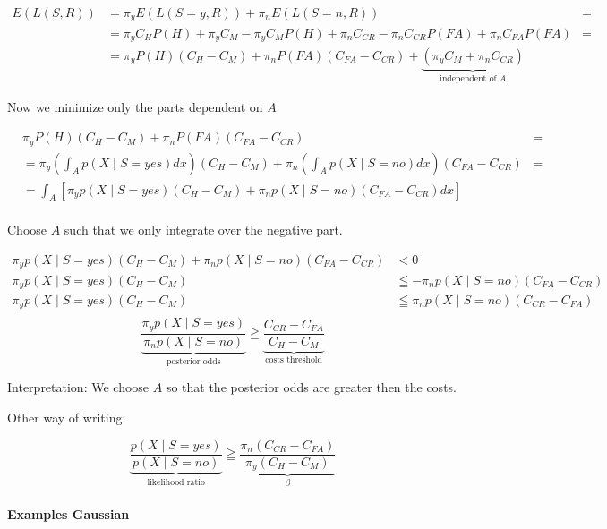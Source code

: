 \begin{align*}
E(L(S,R)) &= \pi_y  E(L(S=y, R)) + \pi_n E(L(S=n, R)) &= \\
&= \pi_y C_H  P(H) + \pi_y C_M - \pi_y C_M P(H) + \pi_n C_{CR} - \pi_n C_{CR} P(FA) + \pi_n C_{FA} P(FA) &= \\
&= \pi_y P(H) (C_H - C_M) + \pi_n P(FA) (C_{FA} - C_{CR}) + \underbrace{(\pi_y C_M + \pi_n C_{CR})}_{\text{independent of } A} &
\end{align*}

Now we minimize only the parts dependent on $A$

\begin{align*}
& \pi_y P(H) (C_H - C_M) + \pi_n P(FA) (C_{FA} - C_{CR}) &= \\
&= \pi_y (\int_A p(X \mid S=yes) dx)(C_H - C_M) + \pi_n (\int_A p(X \mid S=no) dx) (C_{FA} - C_{CR}) &= \\
&= \int_A [\pi_y p(X \mid S=yes)(C_H - C_M) + \pi_n p(X \mid S=no)(C_{FA} - C_{CR}) dx] & \\
\end{align*}

Choose $A$ such that we only integrate over the negative part.

\begin{align*}
\pi_y p(X \mid S=yes)(C_H - C_M) + \pi_n p(X \mid S=no)(C_{FA} - C_{CR}) &< 0 \\
\pi_y p(X \mid S=yes)(C_H - C_M) &\leqq - \pi_n p(X \mid S=no)(C_{FA} - C_{CR}) \\
\pi_y p(X \mid S=yes)(C_H - C_M) &\leqq \pi_n p(X \mid S=no)(C_{CR} - C_{FA}) \\
\end{align*}
\begin{equation}
\underbrace{\frac{\pi_y p(X \mid S=yes)}{\pi_n p(X \mid S=no)}}_\text{posterior odds} \geqq \underbrace{\frac{C_{CR} - C_{FA}}{C_H - C_M}}_\text{costs threshold}
\end{equation}

Interpretation: We choose $A$ so that the posterior odds are greater then the costs.

Other way of writing:

\begin{equation}
\underbrace{\frac{p(X \mid S=yes)}{p(X \mid S=no)}}_\text{likelihood ratio} \geqq \underbrace{\frac{\pi_n(C_{CR} - C_{FA})}{\pi_y(C_H - C_M)}}_\beta
\end{equation}


\paragraph{Examples Gaussian}

